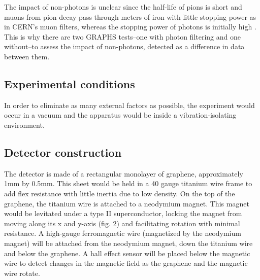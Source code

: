 \documentclass{article}
\begin{document}
    The impact of non-photons is unclear since the half-life of pions is short and muons from pion decay pass through meters of iron with little stopping power as in CERN's muon filters\cite{BEAM2018}, whereas the stopping power of photons is initially high \cite{SABIN}. This is why there are two GRAPHS tests--one with photon filtering and one without--to assess the impact of non-photons, detected as a difference in data between them.

    \subsection{Experimental conditions}

    \indent In order to eliminate as many external factors as possible, the experiment would occur in a vacuum and the apparatus would be inside a vibration-isolating environment.

    \subsection{Detector construction}

\indent The detector is made of a rectangular monolayer of graphene, approximately 1mm by 0.5mm. This sheet would be held in a 40 gauge titanium wire frame to add flex resistance with little inertia due to low density. On the top of the graphene, the titanium wire is attached to a neodymium magnet. This magnet would be levitated under a type II superconductor, locking the magnet from moving along its x and y-axis (fig. 2) and facilitating rotation with minimal resistance. A high-gauge ferromagnetic wire (magnetized by the neodymium magnet) will be attached from the neodymium magnet, down the titanium wire and below the graphene. A hall effect sensor will be placed below the magnetic wire to detect changes in the magnetic field as the graphene and the magnetic wire rotate.
\end{document}
